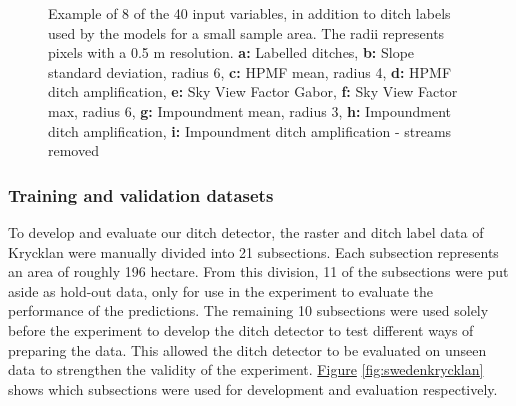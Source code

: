 \documentclass[]{interact}
\theoremstyle{plain}%
\theoremstyle{definition}
\theoremstyle{remark}
\begin{document}
\begin{figure} [!htb]
    \caption{Example of 8 of the 40 input variables, in addition to ditch labels used by the models for a small sample area. The radii represents pixels with a 0.5 m resolution. \newline \textbf{a:} Labelled ditches, \textbf{b:} Slope standard deviation, radius 6, \textbf{c:} HPMF mean, radius 4, \textbf{d:} HPMF ditch amplification, \textbf{e:} Sky View Factor Gabor, \textbf{f:} Sky View Factor max, radius 6, \textbf{g:} Impoundment mean, radius 3, \textbf{h:} Impoundment ditch amplification, \textbf{i:} Impoundment ditch amplification - streams removed}
    \label{fig:features}
\end{figure}

\subsubsection{Training and validation datasets}
\label{trainingvalidationdatasets}
To develop and evaluate our ditch detector, the raster and ditch label data of Krycklan were manually divided into 21 subsections. Each subsection represents an area of roughly 196 hectare. From this division, 11 of the subsections were put aside as hold-out data, only for use in the experiment to evaluate the performance of the predictions. The remaining 10 subsections were used solely before the experiment to develop the ditch detector to test different ways of preparing the data. This allowed the ditch detector to be evaluated on unseen data to strengthen the validity of the experiment. \hyperref[fig:swedenkrycklan]{Figure} \ref{fig:swedenkrycklan} shows which subsections were used for development and evaluation respectively.
\end{document}
